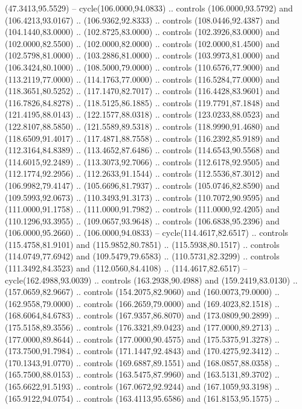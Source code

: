   (47.3413,95.5529) -- cycle(106.0000,94.0833) .. controls (106.0000,93.5792)
  and (106.4213,93.0167) .. (106.9362,92.8333) .. controls (108.0446,92.4387)
  and (104.1440,83.0000) .. (102.8725,83.0000) .. controls (102.3926,83.0000)
  and (102.0000,82.5500) .. (102.0000,82.0000) .. controls (102.0000,81.4500)
  and (102.5798,81.0000) .. (103.2886,81.0000) .. controls (103.9973,81.0000)
  and (106.3424,80.1000) .. (108.5000,79.0000) .. controls (110.6576,77.9000)
  and (113.2119,77.0000) .. (114.1763,77.0000) .. controls (116.5284,77.0000)
  and (118.3651,80.5252) .. (117.1470,82.7017) .. controls (116.4428,83.9601)
  and (116.7826,84.8278) .. (118.5125,86.1885) .. controls (119.7791,87.1848)
  and (121.4195,88.0143) .. (122.1577,88.0318) .. controls (123.0233,88.0523)
  and (122.8107,88.5850) .. (121.5589,89.5318) .. controls (118.9990,91.4680)
  and (118.6509,91.4017) .. (117.4871,88.7558) .. controls (116.2392,85.9189)
  and (112.3164,84.8389) .. (113.4652,87.6486) .. controls (114.6543,90.5568)
  and (114.6015,92.2489) .. (113.3073,92.7066) .. controls (112.6178,92.9505)
  and (112.1774,92.2956) .. (112.2633,91.1544) .. controls (112.5536,87.3012)
  and (106.9982,79.4147) .. (105.6696,81.7937) .. controls (105.0746,82.8590)
  and (109.5993,92.0673) .. (110.3493,91.3173) .. controls (110.7072,90.9595)
  and (111.0000,91.1758) .. (111.0000,91.7982) .. controls (111.0000,92.4205)
  and (110.1296,93.3955) .. (109.0657,93.9648) .. controls (106.6838,95.2396)
  and (106.0000,95.2660) .. (106.0000,94.0833) -- cycle(114.4617,82.6517) ..
  controls (115.4758,81.9101) and (115.9852,80.7851) .. (115.5938,80.1517) ..
  controls (114.0749,77.6942) and (109.5479,79.6583) .. (110.5731,82.3299) ..
  controls (111.3492,84.3523) and (112.0560,84.4108) .. (114.4617,82.6517) --
  cycle(162.4988,93.0039) .. controls (163.2938,90.4988) and (159.2419,83.0130)
  .. (157.0659,82.9667) .. controls (154.2075,82.9060) and (160.0073,79.0000) ..
  (162.9558,79.0000) .. controls (166.2659,79.0000) and (169.4023,82.1518) ..
  (168.6064,84.6783) .. controls (167.9357,86.8070) and (173.0809,90.2899) ..
  (175.5158,89.3556) .. controls (176.3321,89.0423) and (177.0000,89.2713) ..
  (177.0000,89.8644) .. controls (177.0000,90.4575) and (175.5375,91.3278) ..
  (173.7500,91.7984) .. controls (171.1447,92.4843) and (170.4275,92.3412) ..
  (170.1343,91.0770) .. controls (169.6887,89.1551) and (168.0857,88.0358) ..
  (165.7500,88.0153) .. controls (163.5475,87.9960) and (163.5131,89.3702) ..
  (165.6622,91.5193) .. controls (167.0672,92.9244) and (167.1059,93.3198) ..
  (165.9122,94.0754) .. controls (163.4113,95.6586) and (161.8153,95.1575) ..
